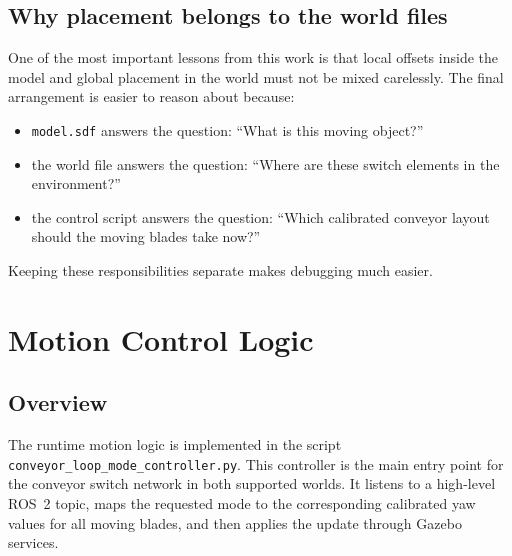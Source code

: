 \documentclass[11pt,a4paper]{article}
\begin{document}


\subsection{Why placement belongs to the world files}
One of the most important lessons from this work is that local offsets inside the model and global placement in the world must not be mixed carelessly. The final arrangement is easier to reason about because:
\begin{itemize}
\item \texttt{model.sdf} answers the question: ``What is this moving object?''
\item the world file answers the question: ``Where are these switch elements in the environment?''
\item the control script answers the question: ``Which calibrated conveyor layout should the moving blades take now?''
\end{itemize}

Keeping these responsibilities separate makes debugging much easier.

\section{Motion Control Logic}
\subsection{Overview}
The runtime motion logic is implemented in the script \texttt{conveyor\_loop\_mode\_controller.py}. This controller is the main entry point for the conveyor switch network in both supported worlds. It listens to a high-level ROS~2 topic, maps the requested mode to the corresponding calibrated yaw values for all moving blades, and then applies the update through Gazebo services.


\end{document}
